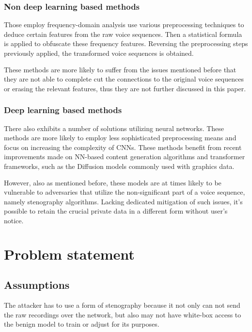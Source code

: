 \documentclass[journal]{IEEEtran} %
\begin{document}
\subsubsection{Non deep learning based methods}

Those employ frequency-domain analysis use various preprocessing techniques to deduce certain features from the raw voice sequences. Then a statistical formula is applied to obfuscate these frequency features. Reversing the preprocessing steps previously applied, the transformed voice sequences is obtained.\cite{a9, a10, a11}

These methods are more likely to suffer from the issues mentioned before that they are not able to complete cut the connections to the original voice sequences or erasing the relevant features, thus they are not further discussed in this paper.

\subsubsection{Deep learning based methods}

There also exhibits a number of solutions utilizing neural networks. These methods are more likely to employ less sophisticated preprocessing means and focus on increasing the complexity of CNNs. These methods benefit from recent improvements made on NN-based content generation algorithms and transformer frameworks, such as the Diffusion models commonly used with graphics data.\cite{a8}

However, also as mentioned before, these models are at times likely to be vulnerable to adversaries that utilize the non-significant part of a voice sequence, namely stenography algorithms. Lacking dedicated mitigation of such issues, it's possible to retain the crucial private data in a different form without user's notice.

\label{seg:problem}
\section{Problem statement}

\subsection{Assumptions}

The attacker has to use a form of stenography because it not only can not send the raw recordings over the network, but also may not have white-box access to the benign model to train or adjust for its purposes.
\end{document}
